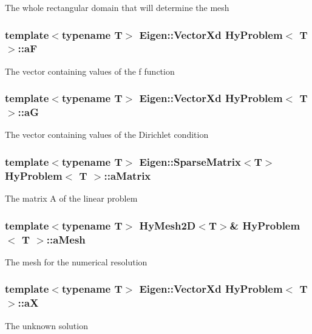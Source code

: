 \label{classHyProblem_a245270926a69fef2df91e3aad939fee3}
The whole rectangular domain that will determine the mesh \hypertarget{classHyProblem_a9c31ddb647141522c68ce12c1fc0036b}{
\subsubsection[{aF}]{\setlength{\rightskip}{0pt plus 5cm}template$<$typename T$>$ Eigen::VectorXd {\bf HyProblem}$<$ T $>$::{\bf aF}}}
\label{classHyProblem_a9c31ddb647141522c68ce12c1fc0036b}
The vector containing values of the f function \hypertarget{classHyProblem_a3426083f6fd97b687b72b6656db0a224}{
\subsubsection[{aG}]{\setlength{\rightskip}{0pt plus 5cm}template$<$typename T$>$ Eigen::VectorXd {\bf HyProblem}$<$ T $>$::{\bf aG}}}
\label{classHyProblem_a3426083f6fd97b687b72b6656db0a224}
The vector containing values of the Dirichlet condition \hypertarget{classHyProblem_a4930e5e04c383d64f8a3eb2dfe24fb54}{
\subsubsection[{aMatrix}]{\setlength{\rightskip}{0pt plus 5cm}template$<$typename T$>$ Eigen::SparseMatrix$<$T$>$ {\bf HyProblem}$<$ T $>$::{\bf aMatrix}}}
\label{classHyProblem_a4930e5e04c383d64f8a3eb2dfe24fb54}
The matrix A of the linear problem \hypertarget{classHyProblem_a370a94346e3e688f352f60ff1e8ba1ab}{
\subsubsection[{aMesh}]{\setlength{\rightskip}{0pt plus 5cm}template$<$typename T$>$ {\bf HyMesh2D}$<$T$>$\& {\bf HyProblem}$<$ T $>$::{\bf aMesh}}}
\label{classHyProblem_a370a94346e3e688f352f60ff1e8ba1ab}
The mesh for the numerical resolution \hypertarget{classHyProblem_ad08883fb8ad06aadda0302fc387433cf}{
\subsubsection[{aX}]{\setlength{\rightskip}{0pt plus 5cm}template$<$typename T$>$ Eigen::VectorXd {\bf HyProblem}$<$ T $>$::{\bf aX}}}
\label{classHyProblem_ad08883fb8ad06aadda0302fc387433cf}
The unknown solution 

